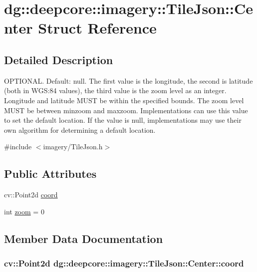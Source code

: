 \hypertarget{structdg_1_1deepcore_1_1imagery_1_1_tile_json_1_1_center}{}\section{dg\+:\+:deepcore\+:\+:imagery\+:\+:Tile\+Json\+:\+:Center Struct Reference}
\label{structdg_1_1deepcore_1_1imagery_1_1_tile_json_1_1_center}


\subsection{Detailed Description}
O\+P\+T\+I\+O\+N\+AL. Default\+: null. The first value is the longitude, the second is latitude (both in W\+GS\+:84 values), the third value is the zoom level as an integer. Longitude and latitude M\+U\+ST be within the specified bounds. The zoom level M\+U\+ST be between minzoom and maxzoom. Implementations can use this value to set the default location. If the value is null, implementations may use their own algorithm for determining a default location. 

{\ttfamily \#include $<$imagery/\+Tile\+Json.\+h$>$}

\subsection*{Public Attributes}
\begin{DoxyCompactItemize}
\item 
cv\+::\+Point2d \hyperlink{structdg_1_1deepcore_1_1imagery_1_1_tile_json_1_1_center_a3280457ff480662ddfeaf54cf78ecac5}{coord}
\item 
int \hyperlink{structdg_1_1deepcore_1_1imagery_1_1_tile_json_1_1_center_a81f1b2f35f3c6a6338eae7280b652a58}{zoom} = 0
\end{DoxyCompactItemize}


\subsection{Member Data Documentation}
\subsubsection[{\texorpdfstring{coord}{coord}}]{\setlength{\rightskip}{0pt plus 5cm}cv\+::\+Point2d dg\+::deepcore\+::imagery\+::\+Tile\+Json\+::\+Center\+::coord}\hypertarget{structdg_1_1deepcore_1_1imagery_1_1_tile_json_1_1_center_a3280457ff480662ddfeaf54cf78ecac5}{}\label{structdg_1_1deepcore_1_1imagery_1_1_tile_json_1_1_center_a3280457ff480662ddfeaf54cf78ecac5}
